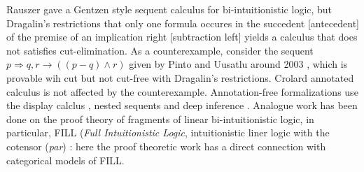 Rauszer  \cite{Rauszer:1974a} gave a Gentzen style sequent calculus for bi-intuitionistic logic, but Dragalin's
restrictions that only one formula occures in the succedent [antecedent] of the premise of an implication right
[subtraction left] yields a calculus that does not satisfies cut-elimination. As a counterexample, consider the
sequent $p \Rightarrow q, r \rightarrow ((p - q) \wedge r)$ given by Pinto and Uusatlu around 2003 \cite{Pinto-Uustalu:2010},
which is  provable wih cut but not cut-free with Dragalin's restrictions. Crolard annotated calculus is not affected
by the counterexample.  Annotation-free formalizations use the display calclus \cite{Gore:2000}, nested sequents
\cite{GorePostnieceTiu:2008} and deep inference \cite{Postniece:2009}.
Analogue work has been done on the proof theory of fragments of linear bi-intuitionistic logic, in particular,
FILL (\emph{Full Intuitionistic Logic}, intuitionistic liner logic with the cotensor (\emph{par})
\cite{CloustonDawsonGoreTiu:2013}: here the proof theoretic work has a direct connection with categorical models of FILL.
